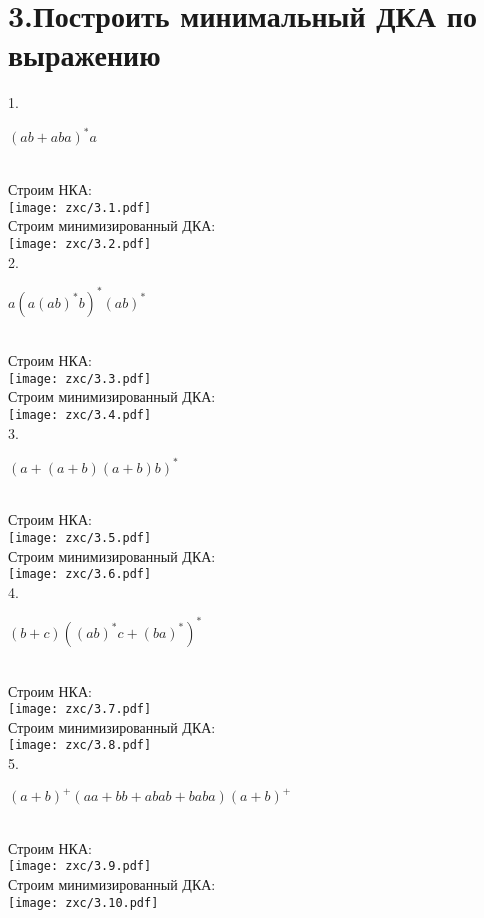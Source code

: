 \documentclass{article}
\begin{document}
\section{3.Построить минимальный ДКА по выражению}
1.{\large\item $(ab+aba)^*a$} \\
Строим НКА:\\
    \texttt{[image: zxc/3.1.pdf]}\\
Строим минимизированный ДКА:\\
    \texttt{[image: zxc/3.2.pdf]}\\
2.{\large\item $a(a(ab)^*b)^*(ab)^*$} \\
Строим НКА:\\
    \texttt{[image: zxc/3.3.pdf]}\\
Строим минимизированный ДКА:\\
    \texttt{[image: zxc/3.4.pdf]}\\
3.{\large\item $(a+(a+b)(a+b)b)^*$} \\
Строим НКА:\\
    \texttt{[image: zxc/3.5.pdf]}\\
Строим минимизированный ДКА:\\
    \texttt{[image: zxc/3.6.pdf]}\\
4.{\large\item $(b+c)((ab)^*c+(ba)^*)^*$} \\
Строим НКА:\\
    \texttt{[image: zxc/3.7.pdf]}\\
Строим минимизированный ДКА:\\
    \texttt{[image: zxc/3.8.pdf]}\\
5.{\large\item $(a+b)^+(aa+bb+abab+baba)(a+b)^+$} \\
Строим НКА:\\
    \texttt{[image: zxc/3.9.pdf]}\\
Строим минимизированный ДКА:\\
    \texttt{[image: zxc/3.10.pdf]}\\
\end{document}
